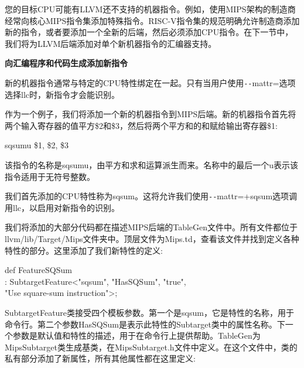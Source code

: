 您的目标CPU可能有LLVM还不支持的机器指令。例如，使用MIPS架构的制造商经常向核心MIPS指令集添加特殊指令。RISC-V指令集的规范明确允许制造商添加新的指令，或者要添加一个全新的后端，然后必须添加CPU指令。在下一节中，我们将为LLVM后端添加对单个新机器指令的汇编器支持。\par

\hspace*{\fill} \par %
\textbf{向汇编程序和代码生成添加新指令}

新的机器指令通常与特定的CPU特性绑定在一起。只有当用户使用\verb|--|mattr=选项选择llc时，新指令才会能识别。\par

作为一个例子，我们将添加一个新的机器指令到MIPS后端。新的机器指令首先将两个输入寄存器的值平方\$2和\$3，然后将两个平方和的和赋给输出寄存器\$1:\par

\begin{tcolorbox}[colback=white,colframe=black]
sqsumu \$1, \$2, \$3
\end{tcolorbox}

该指令的名称是sqsumu，由平方和求和运算派生而来。名称中的最后一个u表示该指令适用于无符号整数。\par

我们首先添加的CPU特性称为sqsum。这将允许我们使用\verb|--|mattr=+sqsum选项调用llc，以启用对新指令的识别。\par

我们将添加的大部分代码都在描述MIPS后端的TableGen文件中。所有文件都位于llvm/lib/\allowbreak Target/Mips文件夹中。顶层文件为Mips.td，查看该文件并找到定义各种特性的部分。这里添加了我们新特性的定义:\par

\begin{tcolorbox}[colback=white,colframe=black]
def FeatureSQSum \\
\hspace*{1cm}: SubtargetFeature<"sqsum", "HasSQSum", "true", \\
\hspace*{6cm}"Use square-sum instruction">;
\end{tcolorbox}

SubtargetFeature类接受四个模板参数。第一个是sqsum，它是特性的名称，用于命令行。第二个参数HasSQSum是表示此特性的Subtarget类中的属性名称。下一个参数是默认值和特性的描述，用于在命令行上提供帮助。TableGen为MipsSubtarget类生成基类，在MipsSubtarget.h文件中定义。在这个文件中，类的私有部分添加了新属性，所有其他属性都在这里定义:\par


